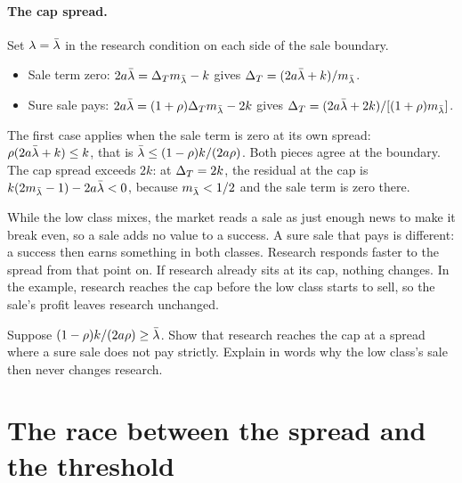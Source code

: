 \paragraph{The cap spread.} Set \(\lambda=\bar\lambda\) in the research condition on each side of the sale boundary.
\begin{itemize}
\item Sale term zero: \(2a\bar\lambda=\Delta_T m_{\bar\lambda}-k\) gives \(\Delta_T=(2a\bar\lambda+k)/m_{\bar\lambda}\).
\item Sure sale pays: \(2a\bar\lambda=(1+\rho)\Delta_T m_{\bar\lambda}-2k\) gives \(\Delta_T=(2a\bar\lambda+2k)/[(1+\rho)m_{\bar\lambda}]\).
\end{itemize}
The first case applies when the sale term is zero at its own spread: \(\rho(2a\bar\lambda+k)\le k\), that is
\(\bar\lambda\le(1-\rho)k/(2a\rho)\). Both pieces agree at the boundary. The cap spread exceeds \(2k\): at \(\Delta_T=2k\), the
residual at the cap is \(k(2m_{\bar\lambda}-1)-2a\bar\lambda<0\), because \(m_{\bar\lambda}<1/2\) and the sale term is zero there.

\begin{intuition}
While the low class mixes, the market reads a sale as just enough news to make it break even, so a sale adds no value
to a success. A sure sale that pays is different: a success then earns something in both classes. Research responds
faster to the spread from that point on. If research already sits at its cap, nothing changes. In the example,
research reaches the cap before the low class starts to sell, so the sale's profit leaves research unchanged.
\end{intuition}

\begin{checkyourself}\label{q:research-kink}
Suppose \((1-\rho)k/(2a\rho)\ge\bar\lambda\). Show that research reaches the cap at a spread where a sure sale does not pay
strictly. Explain in words why the low class's sale then never changes research.
\end{checkyourself}

\section{The race between the spread and the threshold}\label{sec:research-race}

